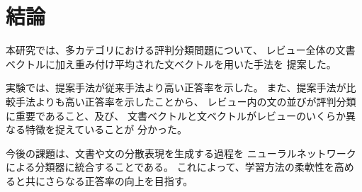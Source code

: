\documentclass{ttisummary}
\begin{document}
%



\section{結論}

本研究では、多カテゴリにおける評判分類問題について、
レビュー全体の文書ベクトルに加え重み付け平均された文ベクトルを用いた手法を
提案した。

実験では、提案手法が従来手法\cite{fujitani15}より高い正答率を示した。
また、提案手法が比較手法よりも高い正答率を示したことから、
レビュー内の文の並びが評判分類に重要であること、及び、
文書ベクトルと文ベクトルがレビューのいくらか異なる特徴を捉えていることが
分かった。

今後の課題は、文書や文の分散表現を生成する過程を
ニューラルネットワークによる分類器に統合することである。
これによって、学習方法の柔軟性を高めると共にさらなる正答率の向上を目指す。
\end{document}
